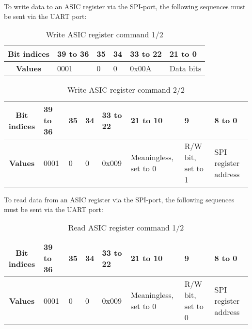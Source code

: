To write data to an ASIC register via the SPI-port, the following sequences must be sent via the UART port:


\begin{table}[H]

    \label{tab:6}
    
  \begin{center}  
  \begin{tabular}{|c|p{2cm}|p{2cm}|p{2.5cm}|p{2cm}|p{2cm}|}
  \hline
  \textbf{Bit indices}  & 39 to 36  & 35 & 34 & 33 to 22 & 21 to 0\\ 
  \hline
  \textbf{Values} & 0001  & 0 & 0 & 0x00A & Data bits \\
  \hline
  
\end{tabular}
\end{center}
\caption[]{Write ASIC register command 1/2}
\end{table}

\begin{table}[H]

    \label{tab:7}
    
  \begin{center}  
  \begin{tabular}{|c|p{1.5cm}|p{0.7cm}|p{1cm}|p{1cm}|p{1cm}|p{2cm}|p{2cm}|}
  \hline
  \textbf{Bit indices}  & 39 to 36  & 35 & 34 & 33 to 22 & 21 to 10 & 9 & 8 to 0\\ 
  \hline
  \textbf{Values} & 0001  & 0 & 0 & 0x009 & Meaningless, set to 0 & R/W bit, set to 1 & SPI register address \\
  \hline
  
\end{tabular}
\end{center}
\caption[]{Write ASIC register command 2/2}
\end{table}

To read data from an ASIC register via the SPI-port, the following sequences must be sent via the UART port:

\begin{table}[H]

    \label{tab:8}
    
  \begin{center}  
  \begin{tabular}{|c|p{1.5cm}|p{0.7cm}|p{1cm}|p{1cm}|p{1cm}|p{2cm}|p{2cm}|}
  \hline
  \textbf{Bit indices}  & 39 to 36  & 35 & 34 & 33 to 22 & 21 to 10 & 9 & 8 to 0\\ 
  \hline
  \textbf{Values} & 0001  & 0 & 0 & 0x009 & Meaningless, set to 0 & R/W bit, set to 0 & SPI register address \\
  \hline
  
\end{tabular}
\end{center}
\caption[]{Read ASIC register command 1/2}
\end{table}


